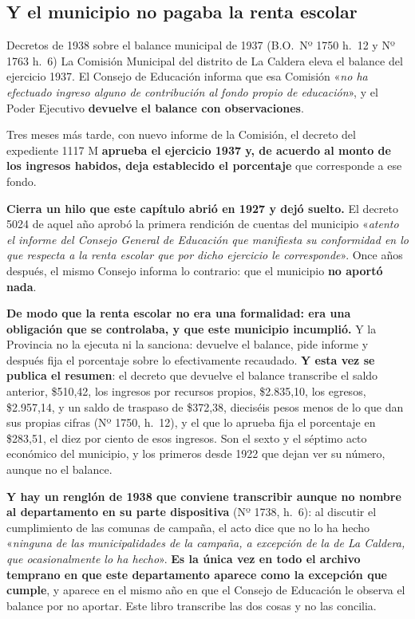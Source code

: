 \subsection*{Y el municipio no pagaba la renta escolar}

\begin{ficha}{Decretos de 1938 sobre el balance municipal de 1937 (B.O.\ Nº 1750 h.\ 12 y Nº 1763 h.\ 6)}
La Comisión Municipal del distrito de La Caldera eleva el balance del ejercicio
1937. El Consejo de Educación informa que esa Comisión «\textit{no ha efectuado
ingreso alguno de contribución al fondo propio de educación}», y el Poder
Ejecutivo \textbf{devuelve el balance con observaciones}.

Tres meses más tarde, con nuevo informe de la Comisión, el decreto del expediente
1117 M \textbf{aprueba el ejercicio 1937 y, de acuerdo al monto de los ingresos
habidos, deja establecido el porcentaje} que corresponde a ese fondo.
\end{ficha}

\begin{cautela}
\textbf{Cierra un hilo que este capítulo abrió en 1927 y dejó suelto.} El
decreto 5024 de aquel año aprobó la primera rendición de cuentas del municipio
«\textit{atento el informe del Consejo General de Educación que manifiesta su
conformidad en lo que respecta a la renta escolar que por dicho ejercicio le
corresponde}». Once años después, el mismo Consejo informa lo contrario: que el
municipio \textbf{no aportó nada}.

\textbf{De modo que la renta escolar no era una formalidad: era una
obligación que se controlaba, y que este municipio incumplió.} Y la Provincia
no la ejecuta ni la sanciona: devuelve el balance, pide informe y después fija
el porcentaje sobre lo efectivamente recaudado. \textbf{Y esta vez se publica
el resumen}: el decreto que devuelve el balance transcribe el saldo anterior, \$510,42, los ingresos por recursos propios, \$2.835,10, los egresos, \$2.957,14, y un saldo de traspaso de \$372,38, dieciséis pesos menos de lo que dan sus propias cifras (Nº 1750, h.\ 12), y el que lo aprueba fija el porcentaje en \$283,51, el diez por ciento de esos ingresos.
Son el sexto y el séptimo acto económico del municipio, y los primeros desde 1922 que dejan ver su
número, aunque no el balance.

\textbf{Y hay un renglón de 1938 que conviene transcribir aunque no nombre al
departamento en su parte dispositiva} (Nº 1738, h.\ 6): al discutir el
cumplimiento de las comunas de campaña, el acto dice que no lo ha hecho
«\textit{ninguna de las municipalidades de la campaña, a excepción de la de La
Caldera, que ocasionalmente lo ha hecho}». \textbf{Es la única vez en todo el
archivo temprano en que este departamento aparece como la excepción que
cumple}, y aparece en el mismo año en que el Consejo de Educación le observa el
balance por no aportar. Este libro transcribe las dos cosas y no las concilia.
\end{cautela}

